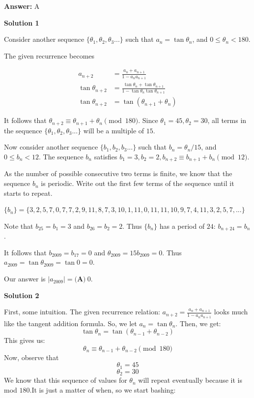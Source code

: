 \begin{enumerate}
 \textbf{Answer: }A



\textbf{Solution 1}

Consider another sequence $\{\theta_1, \theta_2, \theta_3...\}$ such that $a_n = \tan{\theta_n}$, and $0 \leq \theta_n < 180$.

 The given recurrence becomes

 
 \begin{align*} a_{n + 2} & = \frac {a_n + a_{n + 1}}{1 - a_na_{n + 1}} \\ \tan{\theta_{n + 2}} & = \frac {\tan{\theta_n} + \tan{\theta_{n + 1}}}{1 - \tan{\theta_n}\tan{\theta_{n + 1}}} \\ \tan{\theta_{n + 2}} & = \tan(\theta_{n + 1} + \theta_n) \end{align*}


 It follows that $\theta_{n + 2} \equiv \theta_{n + 1} + \theta_{n} \pmod{180}$. Since $\theta_1 = 45, \theta_2 = 30$, all terms in the sequence $\{\theta_1, \theta_2, \theta_3...\}$ will be a multiple of $15$.

 Now consider another sequence $\{b_1, b_2, b_3...\}$ such that $b_n = \theta_n/15$, and $0 \leq b_n < 12$. The sequence $b_n$ satisfies $b_1 = 3, b_2 = 2, b_{n + 2} \equiv b_{n + 1} + b_n \pmod{12}$.

 As the number of possible consecutive two terms is finite, we know that the sequence $b_n$ is periodic. Write out the first few terms of the sequence until it starts to repeat.

 $\{b_n\} = \{3,2,5,7,0,7,7,2,9,11,8,7,3,10,1,11,0,11,11,10,9,7,4,11,3,2,5,7,...\}$

 Note that $b_{25} = b_1 = 3$ and $b_{26} = b_2 = 2$. Thus $\{b_n\}$ has a period of $24$: $b_{n + 24} = b_n$.

 It follows that $b_{2009} = b_{17} = 0$ and $\theta_{2009} = 15 b_{2009} = 0$. Thus $a_{2009} = \tan{\theta_{2009}} = \tan{0} = 0.$

 Our answer is $|a_{2009}| = \boxed{\textbf{(A)}\ 0}$.

 



\textbf{Solution 2}

First, some intuition. The given recurrence relation: $a_{n + 2} = \frac {a_n + a_{n + 1}}{1 - a_na_{n + 1}}$ looks much like the tangent addition formula. So, we let $a_n=\tan{\theta_n}$. Then, we get:
 \[\tan{\theta_n}=\tan{(\theta_{n-1}+\theta_{n-2})}\]This gives us:
 \[\theta_n \equiv \theta_{n-1}+\theta_{n-2} \pmod{180}\]Now, observe that 
 \[\theta_1=45\]
 \[\theta_2=30\]We know that this sequence of values for $\theta_n$ will repeat eventually because it is mod $180$.It is just a matter of when, so we start bashing:


\end{enumerate}
